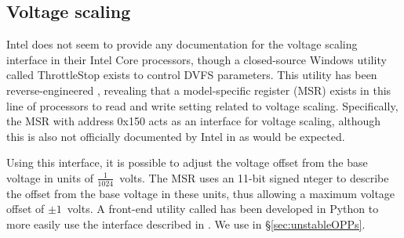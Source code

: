 \subsection{Voltage scaling}
\label{sec:undervolt}

Intel does not seem to provide any documentation for the voltage
scaling interface in their Intel Core processors, though a closed-source
Windows utility called ThrottleStop \cite{throttlestop} exists to control DVFS
parameters. This utility has been reverse-engineered \cite{elersicDoc},
revealing that a model-specific register (MSR) exists in this line of processors
to read and write setting related to voltage scaling. Specifically, the MSR with
address 0x150 acts as an interface for voltage scaling, although this is also
not officially documented by Intel in \cite[Volume 4, §2.13]{intelDevManual} as
would be expected.

Using this interface, it is possible to adjust the voltage offset from the base
voltage in units of $\frac{1}{1024}$~volts. The MSR uses an 11-bit signed 
nteger to describe the offset from the base voltage in these units, thus
allowing a maximum voltage offset of $\pm{1}$~volts. A front-end utility called
 \cite{whewellUndervolt} has been developed in Python to more
easily use the interface described in \cite{elersicDoc}. We use 
in §\ref{sec:unstableOPPs}.
